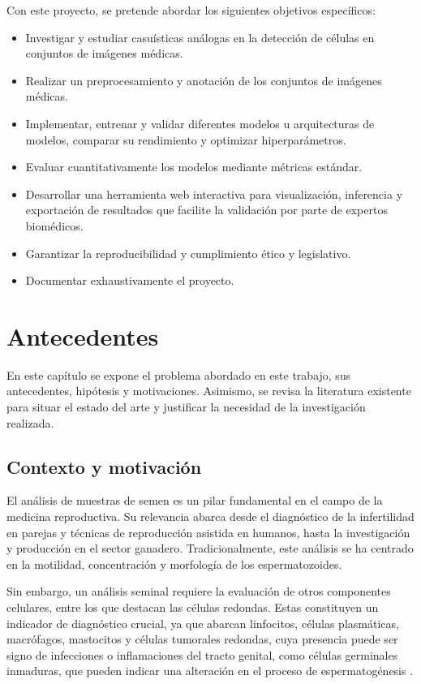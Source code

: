 \documentclass[12pt,a4paper,onecolumn,oneside]{report}
\begin{document}
Con este proyecto, se pretende abordar los siguientes objetivos específicos: 

\begin{itemize}
  \item Investigar y estudiar casuísticas análogas en la detección de células en conjuntos de imágenes médicas.
  \item Realizar un preprocesamiento y anotación de los conjuntos de imágenes médicas.
  \item Implementar, entrenar y validar diferentes modelos u arquitecturas de modelos, comparar su rendimiento y optimizar hiperparámetros.
  \item Evaluar cuantitativamente los modelos mediante métricas estándar.
  \item Desarrollar una herramienta web interactiva para visualización, inferencia y exportación de resultados que facilite la validación por parte de expertos biomédicos.
  \item Garantizar la reproducibilidad y cumplimiento ético y legislativo.
  \item Documentar exhaustivamente el proyecto.
\end{itemize}


\chapter{Antecedentes} %
\label{Antecedentes}

En este capítulo se expone el problema abordado en este trabajo, sus antecedentes, hipótesis y motivaciones. 
Asimismo, se revisa la literatura existente para situar el estado del arte y justificar la necesidad de la investigación realizada.

\section{Contexto y motivación}
\label{sec:Contexto y motivación}

El análisis de muestras de semen es un pilar fundamental en el campo de la medicina reproductiva. Su relevancia abarca desde el diagnóstico 
de la infertilidad en parejas y técnicas de reproducción asistida en humanos, hasta la investigación y producción en el sector ganadero. Tradicionalmente,
este análisis se ha centrado en la motilidad, concentración y morfología de los espermatozoides.

Sin embargo, un análisis seminal requiere la evaluación de otros componentes celulares, entre los que destacan las células redondas. 
Estas constituyen un indicador de diagnóstico crucial, ya que abarcan linfocitos, células plasmáticas, macrófagos, mastocitos y células tumorales redondas, cuya presencia puede ser signo de infecciones o inflamaciones 
del tracto genital, como células germinales inmaduras, que pueden indicar una alteración en el proceso de espermatogénesis \cite{HamiltonThorneRoundCells}.
\end{document}
